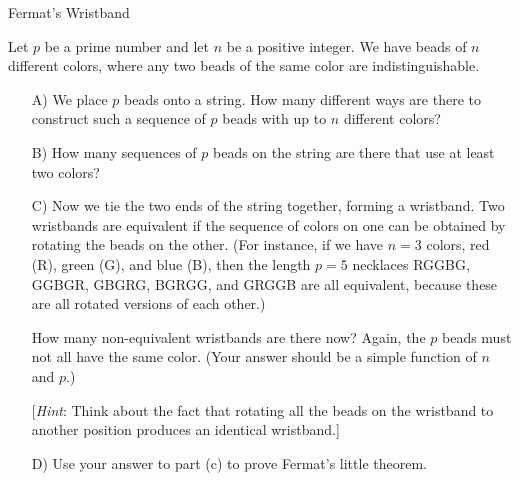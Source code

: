 \begin{homeworkProblem}{Fermat's Wristband}

Let $p$ be a prime number and let $n$ be a positive integer. We have 
beads of $n$ different colors, where any two beads of the same color 
are indistinguishable.

\begin{itemize}
    \item[A)]
    We place $p$ beads onto a string. How many different ways are there 
    to construct such a sequence of $p$ beads with up to $n$ different 
    colors?

    \item[B)] 
    How many sequences of $p$ beads on the string are there that use at 
    least two colors?

    \item[C)]
    Now we tie the two ends of the string together, forming a wristband. 
    Two wristbands are equivalent if the sequence of colors on one can 
    be obtained by rotating the beads on the other. (For instance, if we 
    have $n=3$ colors, red (R), green (G), and blue (B), then the length 
    $p = 5$ necklaces RGGBG, GGBGR, GBGRG, BGRGG, and GRGGB are all 
    equivalent, because these are all rotated versions of each other.)

    How many non-equivalent wristbands are there now? Again, the $p$ 
    beads must not all have the same color. (Your answer should be a 
    simple function of $n$ and $p$.)

    [\textit{Hint}: Think about the fact that rotating all the beads on 
    the wristband to another position produces an identical wristband.]

    \item[D)] Use your answer to part (c) to prove Fermat's little 
    theorem.
\end{itemize}

\end{homeworkProblem}
